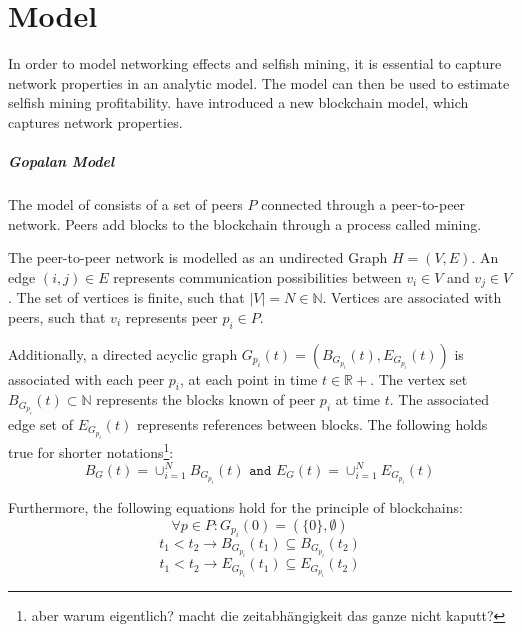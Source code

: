 \chapter{Model}\label{chap:model}
In order to model networking effects and selfish mining, it is essential to capture network properties in an analytic model. The model can then be used to estimate selfish mining profitability.
\citeauthor{gopalan} have introduced a new blockchain model, which captures network properties.

\paragraph{Gopalan Model}\label{gopalan}
The model of \citeauthor{gopalan} consists of a set of peers $P$ connected through a peer-to-peer network. Peers add blocks to the blockchain through a process called mining. 

The peer-to-peer network is modelled as an undirected Graph $H = (V,E)$.
An edge $(i,j) \in E$ represents communication possibilities between $v_i \in V$ and $v_j \in V$. 
The set of vertices is finite, such that $|V|=N \in \mathbb{N}$.
Vertices are associated with peers, such that $v_i$ represents peer $p_i \in P$.

Additionally, a directed acyclic graph $G_{p_i}(t) = (B_{G_{p_i}}(t),E_{G_{p_i}}(t))$ is associated with each peer $p_i$, at each point in time $t \in \mathbb{R+}$.
The vertex set $B_{G_{p_i}}(t) \subset \mathbb{N}$ represents the blocks known of peer $p_i$ at time $t$. The associated edge set of $E_{G_{p_i}}(t)$ represents references between blocks.
The following holds true for shorter notations\footnote{aber warum eigentlich? macht die zeitabhängigkeit das ganze nicht kaputt?}:
\begin{equation}
B_G(t) = \cup_{i=1}^N B_{G_{p_i}}(t) \texttt{ and } E_G(t) = \cup_{i=1}^N E_{G_{p_i}}(t)
\end{equation}

Furthermore, the following equations hold for the principle of blockchains:
\begin{equation}
\forall p \in P: G_{p_i}(0) = (\{0\},\emptyset)
\label{genesis}
\end{equation}
\begin{equation}
t_1 < t_2 \rightarrow B_{G_{p_i}}(t_1) \subseteq B_{G_{p_i}}(t_2)
\label{nodegrow}
\end{equation}
\begin{equation}
t_1 < t_2 \rightarrow E_{G_{p_i}}(t_1) \subseteq E_{G_{p_i}}(t_2)
\label{edgegrow}
\end{equation}

